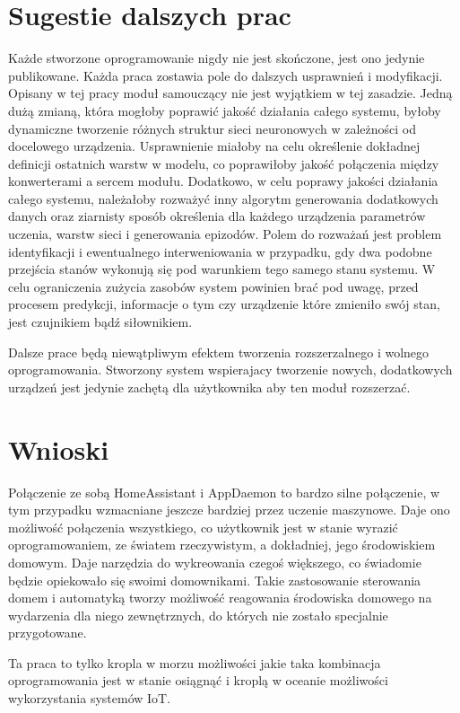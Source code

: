 \section*{Sugestie dalszych prac}
Każde stworzone oprogramowanie nigdy nie jest skończone, jest ono jedynie publikowane. Każda praca zostawia pole do dalszych usprawnień i modyfikacji. Opisany w tej pracy moduł samouczący nie jest wyjątkiem w tej zasadzie. Jedną dużą zmianą, która mogłoby poprawić jakość działania całego systemu, byłoby dynamiczne tworzenie różnych struktur sieci neuronowych w zależności od docelowego urządzenia. Usprawnienie miałoby na celu określenie dokładnej definicji ostatnich warstw w modelu, co poprawiłoby jakość połączenia między konwerterami a sercem modułu. Dodatkowo, w celu poprawy jakości działania całego systemu, należałoby rozważyć inny algorytm generowania dodatkowych danych oraz ziarnisty sposób określenia dla każdego urządzenia parametrów uczenia, warstw sieci i generowania epizodów. Polem do rozważań jest problem identyfikacji i ewentualnego interweniowania w przypadku, gdy dwa podobne przejścia stanów wykonują się pod warunkiem tego samego stanu systemu. W celu ograniczenia zużycia zasobów system powinien brać pod uwagę, przed procesem predykcji, informacje o tym czy urządzenie które zmieniło swój stan, jest czujnikiem bądź siłownikiem.

Dalsze prace będą niewątpliwym efektem tworzenia rozszerzalnego i wolnego oprogramowania. Stworzony system wspierajacy tworzenie nowych, dodatkowych urządzeń jest jedynie zachętą dla użytkownika aby ten moduł rozszerzać.

\section*{Wnioski}

Połączenie ze sobą HomeAssistant i AppDaemon to bardzo silne połączenie, w tym przypadku wzmacniane jeszcze bardziej przez uczenie maszynowe. Daje ono możliwość połączenia wszystkiego, co użytkownik jest w stanie wyrazić oprogramowaniem, ze światem rzeczywistym, a dokładniej, jego środowiskiem domowym. Daje narzędzia do wykreowania czegoś większego, co świadomie będzie opiekowało się swoimi domownikami. Takie zastosowanie sterowania domem i automatyką tworzy możliwość reagowania środowiska domowego na wydarzenia dla niego zewnętrznych, do których nie zostało specjalnie przygotowane. 

Ta praca to tylko kropla w morzu możliwości jakie taka kombinacja oprogramowania jest w stanie osiągnąć i kroplą w oceanie możliwości wykorzystania systemów IoT.
